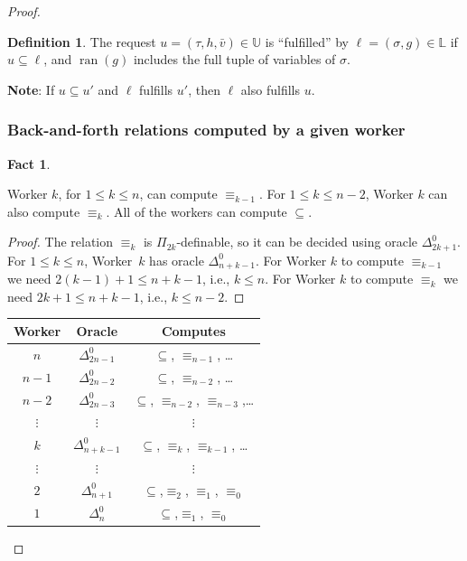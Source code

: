 \documentclass[10pt,a4paper]{article}
\DeclareMathOperator{\ran}{ran}
\theoremstyle{definition}
\newtheorem{defn}[thm]{Definition}
\newtheorem{fact}[thm]{Fact}
\begin{document}
\begin{proof}
\begin{enumerate}
		\end{enumerate} 
		
		\begin{defn}
			
			The request $u = (\tau,h,\bar{v})\in\mathbb{U}$ is ``fulfilled'' by $\ell = (\sigma,g)\in\mathbb{L}$ if $u\subseteq\ell$, and $\ran(g)$ includes the full tuple of variables of $\sigma$. 
			
		\end{defn} 
		
		\smallskip
		
\noindent
		\textbf{Note}:  If $u\subseteq u'$ and $\ell$ fulfills $u'$, then $\ell$ also fulfills $u$.
		
		\subsubsection{Back-and-forth relations computed by a given worker} 
		
		\begin{fact}\label{fact}
			
			Worker $k$, for $1\leq k \leq n$, can compute $\equiv_{k-1}$. For $1\leq k \leq n-2$, Worker $k$ can also compute $\equiv_k$. All of the workers can compute $\subseteq$.
			
		\end{fact}
		
		\begin{proof}
			
			The relation $\equiv_k$ is $\Pi_{2k}$-definable, so it can be decided using oracle $\Delta^0_{2k+1}$. For $1\leq k\leq n$, Worker~$k$ has oracle $\Delta^0_{n+k-1}$. For Worker $k$ to compute $\equiv_{k-1}$ we need $2(k-1)+1\leq n+k-1$, i.e., $k\leq n$. For Worker $k$ to compute $\equiv_k$ we need $2k+1\leq n+k-1$, i.e., $k\leq n-2$.
		\end{proof}
		
		\begin{center}
			\begin{tabular}{|c|c|c|}
				\hline
				Worker & Oracle & Computes \\
				\hline
				$n$ & $\Delta^0_{2n-1}$ & $\subseteq$, $\equiv_{n-1}$, \ldots \\
				$n-1$ & $\Delta^0_{2n-2}$ & $\subseteq$, $\equiv_{n-2}$, \ldots \\
				$n-2$ & $\Delta^0_{2n-3}$ & $\subseteq$, $\equiv_{n-2}$, $\equiv_{n-3}$,\ldots \\
				$\vdots$ & $\vdots$ & $\vdots$ \\
				$k$ & $\Delta^0_{n+k-1}$ & $\subseteq$, $\equiv_k$, $\equiv_{k-1}$, \ldots \\
				$\vdots$ & $\vdots$ & $\vdots$ \\
				$2$ & $\Delta^0_{n+1}$ & $\subseteq$,$\equiv_2$, $\equiv_1$, $\equiv_0$ \\
				$1$ & $\Delta^0_n$ & $\subseteq$,$\equiv_1$, $\equiv_0$ \\
				\hline
			\end{tabular}
		\end{center}
		

\end{proof}
\end{document}
